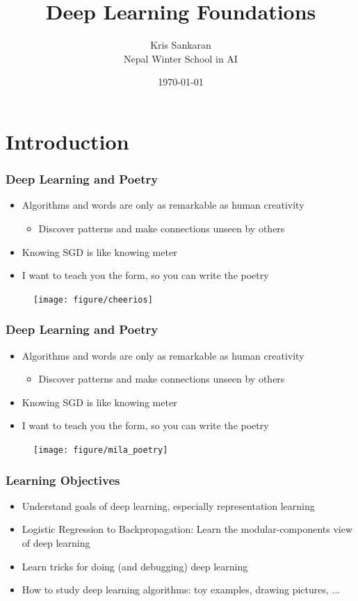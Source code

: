 \documentclass[10pt,mathserif]{beamer}
\title{\large \bfseries Deep Learning Foundations}
\author{Kris Sankaran\\[3ex] Nepal Winter School in AI}
\date{\today}
\begin{document}
\maketitle

\section{Introduction}
\label{sec:introduction}

\begin{frame}
  \frametitle{Deep Learning and Poetry}
  \begin{itemize}
  \item Algorithms and words are only as remarkable as human creativity
    \begin{itemize}
    \item Discover patterns and make connections unseen by others
    \end{itemize}
  \item Knowing SGD is like knowing meter
  \item I want to teach you the form, so you can write the poetry
  \end{itemize}
  \begin{figure}[ht]
    \centering
    \texttt{[image: figure/cheerios]}
\end{figure}
\end{frame}

\begin{frame}
  \frametitle{Deep Learning and Poetry}
  \begin{itemize}
  \item Algorithms and words are only as remarkable as human creativity
    \begin{itemize}
    \item Discover patterns and make connections unseen by others
    \end{itemize}
  \item Knowing SGD is like knowing meter
  \item I want to teach you the form, so you can write the poetry
  \end{itemize}
  \begin{figure}[ht]
    \centering
    \texttt{[image: figure/mila\_poetry]}
\end{figure}
\end{frame}

\begin{frame}
  \frametitle{Learning Objectives}
  \begin{itemize}
    \item Understand goals of deep learning, especially representation learning
    \item Logistic Regression to Backpropagation: Learn the modular-components
      view of deep learning
    \item Learn tricks for doing (and debugging) deep learning %
    \item How to study deep learning algorithms: toy examples,
      drawing pictures, ...
  \end{itemize}
\end{frame}
\end{document}
